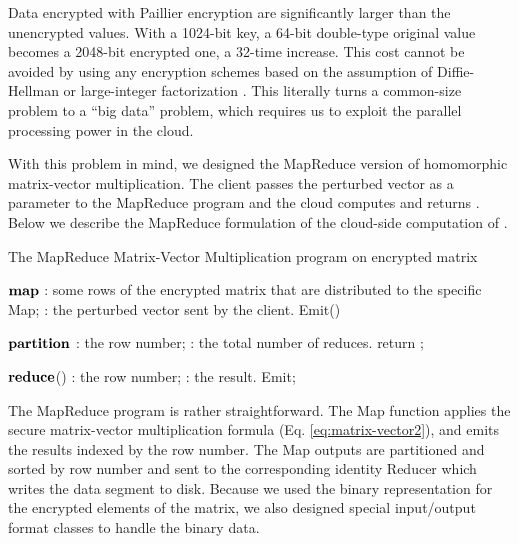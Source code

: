 \documentclass[10pt, conference, compsocconf]{IEEEtran}
\begin{document}
Data encrypted with Paillier encryption are significantly larger than the unencrypted values. With a 1024-bit key, a 64-bit double-type original value becomes a 2048-bit encrypted one, a 32-time increase. This cost cannot be avoided by using any encryption schemes based on the assumption of Diffie-Hellman or large-integer factorization \cite{katz07}. This literally turns a common-size problem to a ``big data'' problem, which requires us to exploit the parallel processing power in the cloud.   

With this problem in mind, we designed the MapReduce version of homomorphic matrix-vector multiplication. The client passes the perturbed vector  as a parameter to the MapReduce program and the cloud computes and returns . 
Below we describe the MapReduce formulation of the cloud-side computation of .

\newcommand{\map}{\ensuremath{\mbox{\bf map}}}
\newcommand{\reduce}{\ensuremath{\mbox{\bf reduce}}}
\newcommand{\partition}{\ensuremath{\mbox{\bf partition}}}
\begin{algorithm}[htb]

\caption{The MapReduce Matrix-Vector Multiplication program on encrypted matrix}
\begin{algorithmic}[1]
\STATE \map
\STATE : some rows of the encrypted matrix  that are distributed to the specific Map; : the perturbed vector sent by the client.
\STATE Emit()
\ENDFOR
\end{algorithmic}
\medskip
\begin{algorithmic}[1]
\STATE \partition
\STATE : the row number; : the total number of reduces.
\STATE return ;
\end{algorithmic}
\medskip
\begin{algorithmic}[1]
\STATE \reduce()
\STATE : the row number; : the result.
\STATE Emit;
\end{algorithmic}
\end{algorithm}

The MapReduce program is rather straightforward. The Map function applies the secure matrix-vector multiplication formula (Eq. \ref{eq:matrix-vector2}), and emits the results indexed by the row number. The Map outputs are partitioned and sorted by row number and sent to the corresponding identity Reducer which writes the data segment to disk. Because we used the binary representation for the encrypted elements of the matrix,  we also designed special input/output format classes to handle the binary data.   
\end{document}
